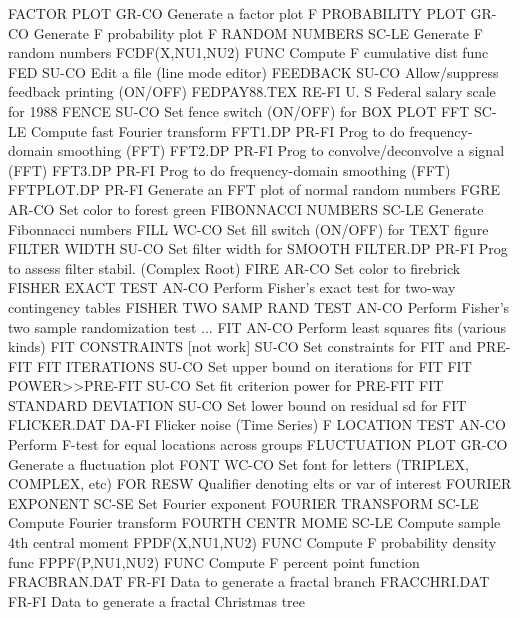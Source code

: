 FACTOR PLOT                 GR-CO Generate  a factor plot
F PROBABILITY PLOT          GR-CO Generate F probability plot
F RANDOM NUMBERS            SC-LE Generate F random numbers
FCDF(X,NU1,NU2)             FUNC  Compute F cumulative dist func
FED                         SU-CO Edit a file (line mode editor)
FEEDBACK                    SU-CO Allow/suppress feedback printing (ON/OFF)
FEDPAY88.TEX                RE-FI U. S Federal salary scale for 1988
FENCE                       SU-CO Set fence switch (ON/OFF) for BOX PLOT
FFT                         SC-LE Compute fast Fourier transform
FFT1.DP                     PR-FI Prog to do frequency-domain smoothing (FFT)
FFT2.DP                     PR-FI Prog to convolve/deconvolve a signal (FFT)
FFT3.DP                     PR-FI Prog to do frequency-domain smoothing (FFT)
FFTPLOT.DP                  PR-FI Generate an FFT plot of normal random numbers
FGRE                        AR-CO Set color to forest green
FIBONNACCI NUMBERS          SC-LE Generate Fibonnacci numbers
FILL                        WC-CO Set fill switch (ON/OFF) for TEXT figure
FILTER WIDTH                SU-CO Set filter width for SMOOTH
FILTER.DP                   PR-FI Prog to assess filter stabil. (Complex Root)
FIRE                        AR-CO Set color to firebrick
FISHER EXACT TEST           AN-CO Perform Fisher's exact test for two-way contingency tables
FISHER TWO SAMP RAND TEST   AN-CO Perform Fisher's two sample randomization test
... FIT                     AN-CO Perform least squares fits (various kinds)
FIT CONSTRAINTS [not work]  SU-CO Set constraints for FIT and PRE-FIT
FIT ITERATIONS              SU-CO Set upper bound on iterations for FIT
FIT POWER>>PRE-FIT          SU-CO Set fit criterion power for PRE-FIT
FIT STANDARD DEVIATION      SU-CO Set lower bound on residual sd for FIT
FLICKER.DAT                 DA-FI Flicker noise (Time Series)
F LOCATION TEST             AN-CO Perform F-test for equal locations across groups
FLUCTUATION PLOT            GR-CO Generate  a fluctuation plot
FONT                        WC-CO Set font for letters (TRIPLEX, COMPLEX, etc)
FOR                         RESW  Qualifier denoting elts or var of interest
FOURIER EXPONENT            SC-SE Set Fourier exponent
FOURIER TRANSFORM           SC-LE Compute Fourier transform
FOURTH CENTR MOME           SC-LE Compute sample 4th central moment
FPDF(X,NU1,NU2)             FUNC  Compute F probability density func
FPPF(P,NU1,NU2)             FUNC  Compute F percent point function
FRACBRAN.DAT                FR-FI Data to generate a fractal branch
FRACCHRI.DAT                FR-FI Data to generate a fractal Christmas tree

